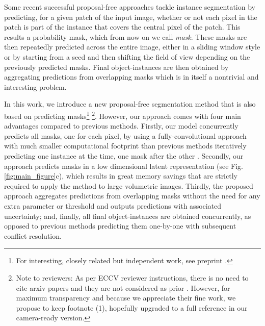  
Some recent successful proposal-free approaches \cite{januszewski2018high,liu2016multi,meirovitch2016multi} tackle instance segmentation by predicting, for a given patch of the input image, whether or not each pixel in the patch is part of the instance that covers the central pixel of the patch. 
This results a probability mask, which from now on we call \emph{\maskname mask}. These masks are then repeatedly predicted across the entire image, either in a sliding window style or by starting from a seed and then shifting the field of view depending on the previously predicted masks. 
Final object-instances are then obtained by aggregating predictions from overlapping masks which is in itself a nontrivial and interesting problem.

In this work, we introduce a new proposal-free segmentation method that is also based on predicting \maskname masks\footnote{For interesting, closely related but independent work, see preprint \cite{hirsch2020patchperpix}.}
\footnote{Note to reviewers: As per ECCV reviewer instructions, there is no need to cite arxiv papers and they are not considered as prior . However, for maximum transparency and because we appreciate their fine work, we propose to keep footnote (1), hopefully upgraded to a full reference in our camera-ready version.}. However, our approach comes with four main advantages compared to previous methods.
Firstly, our model concurrently predicts all \maskname masks, one for each pixel, by using a fully-convolutional approach with much smaller computational footprint than previous methods iteratively predicting one instance at the time, one mask after the other \cite{januszewski2018high,meirovitch2016multi}.
Secondly, our approach predicts \maskname masks in a low dimensional latent representation (see Fig. \ref{fig:main_figure}c), which results in great memory savings that are strictly required to apply the method to large volumetric images. 
Thirdly, the proposed approach aggregates predictions from overlapping \maskname masks without the need for any extra parameter or threshold and outputs predictions with associated uncertainty;
and, finally, all final object-instances are obtained concurrently, as opposed to previous methods predicting them one-by-one with subsequent conflict resolution. 

